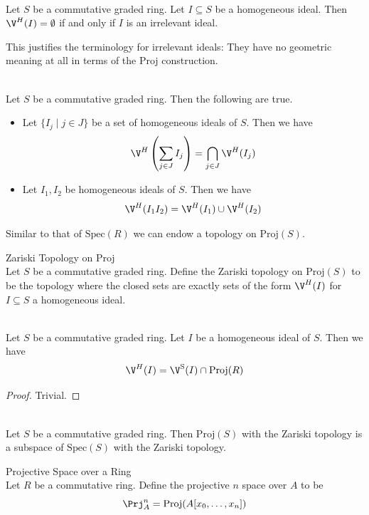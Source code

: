 \documentclass[a4paper]{article}
\begin{document}
\begin{lmm}{}{}\\
Let $S$ be a commutative graded ring. Let $I\subseteq S$ be a homogeneous ideal. Then $\V^H(I)=\emptyset$ if and only if $I$ is an irrelevant ideal. 
\end{lmm}

This justifies the terminology for irrelevant ideals: They have no geometric meaning at all in terms of the Proj construction. 

\begin{prp}{}{}\\
Let $S$ be a commutative graded ring. Then the following are true. 
\begin{itemize}
\item Let $\{I_j\;|\;j\in J\}$ be a set of homogeneous ideals of $S$. Then we have $$\V^H\left(\sum_{j\in J}I_j\right)=\bigcap_{j\in J}\V^H(I_j)$$
\item Let $I_1,I_2$ be homogeneous ideals of $S$. Then we have $$\V^H(I_1I_2)=\V^H(I_1)\cup\V^H(I_2)$$
\end{itemize}
\end{prp}

Similar to that of $\text{Spec}(R)$ we can endow a topology on $\text{Proj}(S)$. 

\begin{defn}{Zariski Topology on Proj}{}\\
Let $S$ be a commutative graded ring. Define the Zariski topology on $\text{Proj}(S)$ to be the topology where the closed sets are exactly sets of the form $\V^H(I)$ for $I\subseteq S$ a homogeneous ideal. 
\end{defn}

\begin{lmm}{}{}\\
Let $S$ be a commutative graded ring. Let $I$ be a homogeneous ideal of $S$. Then we have $$\V^H(I)=\V^\text{S}(I)\cap\text{Proj}(R)$$
\begin{proof}
Trivial. 
\end{proof}
\end{lmm}

\begin{prp}{}{}\\
Let $S$ be a commutative graded ring. Then $\text{Proj}(S)$ with the Zariski topology is a subspace of $\text{Spec}(S)$ with the Zariski topology. 
\end{prp}

\begin{defn}{Projective Space over a Ring}{}\\
Let $R$ be a commutative ring. Define the projective $n$ space over $A$ to be $$\Prj_A^n=\text{Proj}(A[x_0,\dots,x_n])$$
\end{defn}
\end{document}
